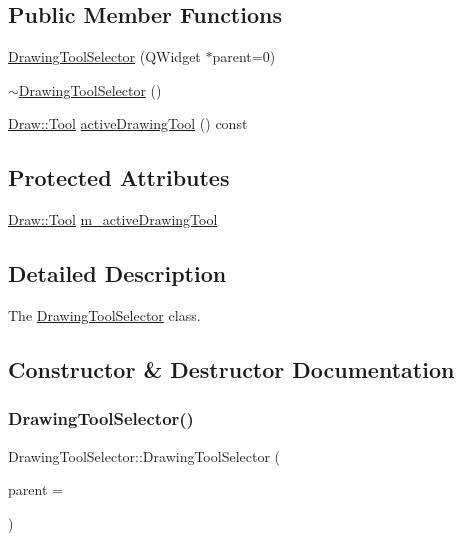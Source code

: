 \subsection*{Public Member Functions}
\begin{DoxyCompactItemize}
\item 
\hyperlink{class_drawing_tool_selector_a04f21c51c1c8eefe90c7974d1551ba7e}{Drawing\+Tool\+Selector} (Q\+Widget $\ast$parent=0)
\item 
\hyperlink{class_drawing_tool_selector_ad5f2e810c40bbeb995711860f6a22394}{$\sim$\+Drawing\+Tool\+Selector} ()
\item 
\hyperlink{class_draw_aef97a848de7a634c35c3ce678be88b9b}{Draw\+::\+Tool} \hyperlink{class_drawing_tool_selector_a2dd6191c8a1418a2512ae06f43c42a64}{active\+Drawing\+Tool} () const
\end{DoxyCompactItemize}
\subsection*{Protected Attributes}
\begin{DoxyCompactItemize}
\item 
\hyperlink{class_draw_aef97a848de7a634c35c3ce678be88b9b}{Draw\+::\+Tool} \hyperlink{class_drawing_tool_selector_ab5f16b690e91d1847f985580accbf79f}{m\+\_\+active\+Drawing\+Tool}
\end{DoxyCompactItemize}


\subsection{Detailed Description}
The \hyperlink{class_drawing_tool_selector}{Drawing\+Tool\+Selector} class. 

\subsection{Constructor \& Destructor Documentation}
\mbox{\label{class_drawing_tool_selector_a04f21c51c1c8eefe90c7974d1551ba7e}} 
\subsubsection{\texorpdfstring{Drawing\+Tool\+Selector()}{DrawingToolSelector()}}
{\footnotesize\ttfamily Drawing\+Tool\+Selector\+::\+Drawing\+Tool\+Selector (\begin{DoxyParamCaption}\item[{Q\+Widget $\ast$}]{parent = {} }\end{DoxyParamCaption})\hspace{0.3cm}{\ttfamily [explicit]}}

